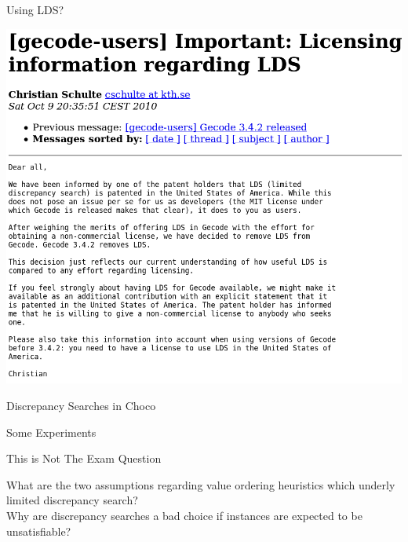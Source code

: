 \documentclass{beamer}
\begin{document}
\begin{frame}{Using LDS?}
    \begin{center}
        \includegraphics*[keepaspectratio=true,scale=0.2]{lds-patent.png}
    \end{center}
\end{frame}

\begin{frame}{Discrepancy Searches in Choco}

\end{frame}

\begin{frame}{Some Experiments}

\end{frame}

\begin{frame}{This is Not The Exam Question}

    What are the two assumptions regarding value ordering heuristics which underly limited
    discrepancy search? \\[0.5cm]

    Why are discrepancy searches a bad choice if instances are expected to be unsatisfiable?

\end{frame}
\end{document}
